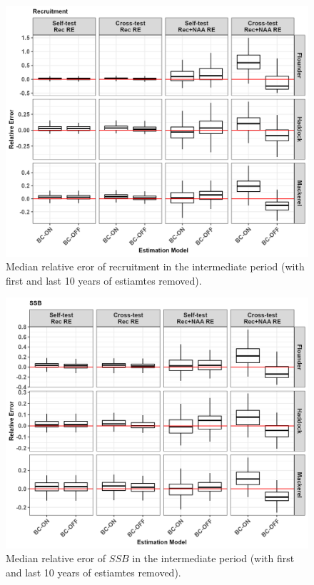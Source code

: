 \documentclass[
  12pt,
]{article}
\begin{document}
\begin{figure}[H]
\centering
\includegraphics[width=\textwidth]{Original_Figures&Tables/Rec_intermediate.PNG}
\caption{Median relative eror of recruitment in the intermediate period (with first and last 10 years of estiamtes removed).}
\label{fig:supp_Rec_intermediate}
\end{figure}

\begin{figure}[H]
\centering
\includegraphics[width=\textwidth]{Original_Figures&Tables/SSB_intermediate.PNG}
\caption{Median relative eror of $SSB$ in the intermediate period (with first and last 10 years of estiamtes removed).}
\label{fig:supp_SSB_intermediate}
\end{figure}

\renewcommand{\thefigure}{\arabic{figure}}

\pagebreak



\pagebreak
\end{document}

